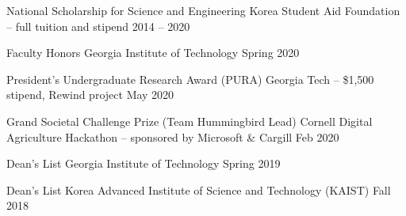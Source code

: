 

\begin{cvhonors}

  \cvhonor
    {National Scholarship for Science and Engineering} %
    {Korea Student Aid Foundation -- full tuition and stipend} %
    {} %
    {2014 -- 2020} %

  \cvhonor
    {Faculty Honors} %
    {Georgia Institute of Technology} %
    {} %
    {Spring 2020} %

  \cvhonor
    {President's Undergraduate Research Award (PURA)} %
    {Georgia Tech -- \$1,500 stipend, Rewind project} %
    {} %
    {May 2020} %

  \cvhonor
    {Grand Societal Challenge Prize (Team Hummingbird Lead)} %
    {Cornell Digital Agriculture Hackathon -- sponsored by Microsoft \& Cargill} %
    {} %
    {Feb 2020} %

  \cvhonor
    {Dean's List} %
    {Georgia Institute of Technology} %
    {} %
    {Spring 2019} %

  \cvhonor
    {Dean's List} %
    {Korea Advanced Institute of Science and Technology (KAIST)} %
    {} %
    {Fall 2018} %


\end{cvhonors}
